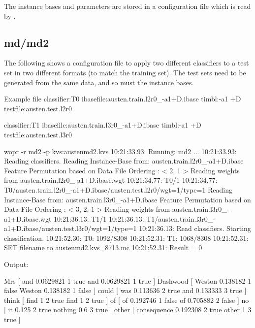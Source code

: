 \documentclass[a4paper,10pt,twoside]{report}
\begin{document}
The instance bases and parameters are stored in a configuration file
which is read by \wopr{}.

\subsection{md/md2} %


The following shows a configuration file to apply two different
classifiers to a test set in two different formats (to match the
training set). The test sets need to be generated from the same data,
and so must the instance bases.

\begin{wout}{Example  file}%
classifier:T0
ibasefile:austen.train.l2r0_-a1+D.ibase
timbl:-a1 +D
testfile:austen.test.l2r0

classifier:T1
ibasefile:austen.train.l3r0_-a1+D.ibase
timbl:-a1 +D
testfile:austen.test.l3r0
\end{wout}

\begin{bash}{}
wopr -r md2 -p kvs:austenmd2.kvs
10:21:33.93: Running: md2
...
10:21:33.93: Reading classifiers.
Reading Instance-Base from: austen.train.l2r0_-a1+D.ibase
Feature Permutation based on Data File Ordering :
< 2, 1 >
Reading weights from austen.train.l2r0_-a1+D.ibase.wgt
10:21:34.77: T0/1
10:21:34.77: T0/austen.train.l2r0_-a1+D.ibase/austen.test.l2r0/wgt=1/type=1
Reading Instance-Base from: austen.train.l3r0_-a1+D.ibase
Feature Permutation based on Data File Ordering :
< 3, 2, 1 >
Reading weights from austen.train.l3r0_-a1+D.ibase.wgt
10:21:36.13: T1/1
10:21:36.13: T1/austen.train.l3r0_-a1+D.ibase/austen.test.l3r0/wgt=1/type=1
10:21:36.13: Read classifiers. Starting classification.
10:21:52.30: T0: 1092/8308
10:21:52.31: T1: 1068/8308
10:21:52.31: SET filename to austenmd2.kvs_8713.mc
10:21:52.31: Result = 0
\end{bash}

Output:
\begin{wout}{}
Mrs [ and 0.0629821 1 true and 0.0629821 1 true ]
Dashwood [ Weston 0.138182 1 false Weston 0.138182 1 false ]
could [ was 0.113636 2 true and 0.133333 3 true ]
think [ find 1 2 true find 1 2 true ]
of [ of 0.192746 1 false of 0.705882 2 false ]
no [ it 0.125 2 true nothing 0.6 3 true ]
other [ consequence 0.192308 2 true other 1 3 true ]
\end{wout}
\end{document}
